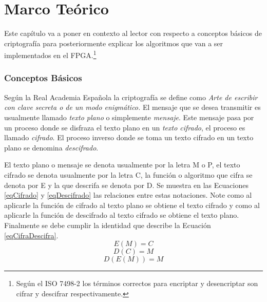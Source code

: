 \chapter{Marco Teórico}

Este capítulo va a poner en contexto al lector con respecto a conceptos básicos de criptografía para posteriormente explicar los algoritmos que van a ser implementados en el FPGA.\footnote{Según el ISO 7498-2 los términos correctos para encriptar y desencriptar son cifrar y descifrar respectivamente.}

\subsection{Conceptos Básicos}
Según la Real Academia Española \cite{} la criptografía se define como 
\newline
\newline
\emph{Arte de escribir con clave secreta o de un modo enigmático.}
\newline
\newline
El mensaje que se desea transmitir es usualmente llamado \textit{texto plano} o simplemente \textit{mensaje}. Este mensaje pasa por un proceso donde se disfraza el texto plano en un \textit{texto cifrado}, el proceso es llamado \textit{cifrado}. El proceso inverso donde se toma un texto cifrado en un texto plano se denomina \textit{descifrado}. 

El texto plano o mensaje se denota usualmente por la letra M o P, el texto cifrado se denota usualmente por la letra C, la función o algoritmo que cifra se denota por E y la que descrifa se denota por D. Se muestra en las Ecuaciones \ref{eqCifrado} y \ref{eqDescifrado} las relaciones entre estas notaciones. Note como al aplicarle la función de cifrado al texto plano se obtiene el texto cifrado y como al aplicarle la función de descifrado al texto cifrado se obtiene el texto plano. Finalmente se debe cumplir la identidad que describe la Ecuación \ref{eqCifraDescifra}. \cite{}
\begin{equation} \label{eqCifrado}
E(M) = C
\end{equation}
\begin{equation} \label{eqDescifrado}
D(C) = M
\end{equation}
\begin{equation} \label{eqCifraDescifra}
D(E(M)) = M
\end{equation}


